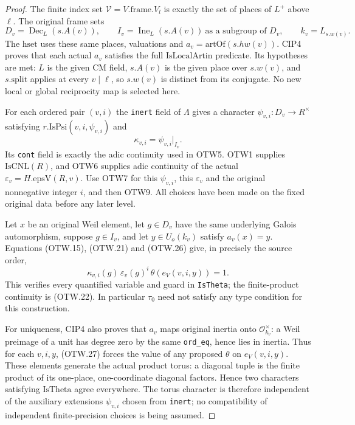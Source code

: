 \begin{proof}
The finite index set $\mathcal V=V.\mathrm{frame}.V_l$ is exactly
the set of places of $L^+$ above $\ell$.  The original frame sets
\[
 D_v=\operatorname{Dec}_{L}(s.A(v)),\qquad
 I_v=\operatorname{Ine}_{L}(s.A(v))\ \text{as a subgroup of }D_v,
 \qquad k_v=L_{s.w(v)}.                              \tag{OTW.25}
\]
The $\mathrm{hset}$ uses these same places, valuations and
$a_v=\mathrm{artOf}(s.hw(v))$.  CIP4 proves that each actual
$a_v$ satisfies the full $\mathrm{IsLocalArtin}$ predicate.
Its hypotheses are met: $L$ is the given CM field, $s.A(v)$ is
the given place over $s.w(v)$, and $s.\mathrm{split}$ applies
at every $v\mid\ell$, so $s.w(v)$ is distinct from its conjugate.
No new local or global reciprocity map is selected here.

For each ordered pair $(v,i)$ the \texttt{inert} field of
$\Lambda$ gives a character
$\psi_{v,i}:D_v\to R^\times$ satisfying
$r.\mathrm{IsPsi}(v,i,\psi_{v,i})$ and
\[
                         \kappa_{v,i}=\psi_{v,i}|_{I_v}.
                         \tag{OTW.26}
\]
Its \texttt{cont} field is exactly the adic continuity used in OTW5.
OTW1 supplies $\mathrm{IsCNL}(R)$, and OTW6 supplies adic
continuity of the actual $\varepsilon_v=H.\mathrm{epsV}(R,v)$.
Use OTW7 for this $\psi_{v,i}$, this $\varepsilon_v$ and the
original nonnegative integer $i$, and then OTW9.  All choices
have been made on the fixed original data before any later level.

Let $x$ be an original Weil element, let $g\in D_v$ have the
same underlying Galois automorphism, suppose $g\in I_v$, and let
$y\in U_o(k_v)$ satisfy $a_v(x)=y$.  Equations
(OTW.15), (OTW.21) and (OTW.26) give, in precisely the source order,
\[
       \kappa_{v,i}(g)\,\varepsilon_v(g)^i\,
                       \theta(e_V(v,i,y))=1.          \tag{OTW.27}
\]
This verifies every quantified variable and guard in
\texttt{IsTheta}; the finite-product continuity is (OTW.22).
In particular $\tau_0$ need not satisfy any type condition for
this construction.

For uniqueness, CIP4 also proves that $a_v$ maps original inertia
onto $\mathcal O_{k_v}^\times$: a Weil preimage of a unit has
degree zero by the same \texttt{ord\_eq}, hence lies in inertia.
Thus for each $v,i,y$, (OTW.27) forces the value of any proposed
$\theta$ on $e_V(v,i,y)$.  These elements generate the actual
product torus: a diagonal tuple is the finite product of its
one-place, one-coordinate diagonal factors.  Hence two characters
satisfying $\mathrm{IsTheta}$ agree everywhere.  The torus
character is therefore independent of the auxiliary extensions
$\psi_{v,i}$ chosen from \texttt{inert}; no compatibility of
independent finite-precision choices is being assumed.
\end{proof}

